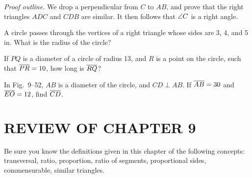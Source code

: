 \documentclass[11pt]{book}
\begin{document}
\noindent\emph{Proof outline.} We drop a perpendicular from $C$ to $AB$, and
prove that the right triangles $ADC$ and $CDB$ are similar. It then follows that
$\angle C$ is a right angle.

\begin{steps}
\end{steps}

\begin{exercisecols}
\begin{exlist}
\item A circle passes through the vertices of a right triangle whose sides are 3,
      4, and 5 in. What is the radius of the circle?
\item If $PQ$ is a diameter of a circle of radius 13, and $R$ is a point on the
      circle, such that $\overline{PR} = 10$, how long is $\overline{RQ}$?
\item In Fig.~9--52, $AB$ is a diameter of the circle, and $CD \perp AB$. If
      $\overline{AB} = 30$ and $\overline{EO} = 12$, find $\overline{CD}$.
\exfig{\FIGIXFIFTYTWO}
\end{exlist}
\end{exercisecols}

\section*{REVIEW OF CHAPTER 9}

Be sure you know the definitions given in this chapter of the following concepts:
transversal, ratio, proportion, ratio of segments, proportional sides,
commensurable, similar triangles.
\end{document}
